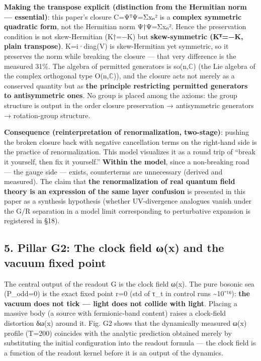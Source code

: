 \documentclass[
]{article}
\begin{document}
\textbf{Making the transpose explicit (distinction from the Hermitian
norm --- essential)}: this paper's closure C=ΨᵀΨ=Σxₙ² is a
\textbf{complex symmetric quadratic form}, not the Hermitian norm
Ψ†Ψ=Σ\textbar xₙ\textbar². Hence the preservation condition is not
skew-Hermitian (K†=−K) but \textbf{skew-symmetric (Kᵀ=−K, plain
transpose)}. K=i·diag(V) is skew-Hermitian yet symmetric, so it
preserves the norm while breaking the closure --- that very difference
is the measured 31\%. The algebra of permitted generators is
so(n,\(\mathbb{C}\)) (the Lie algebra of the complex orthogonal type
O(n,\(\mathbb{C}\))), and the closure acts not merely as a conserved
quantity but as \textbf{the principle restricting permitted generators
to antisymmetric ones}. No group is placed among the axioms: the group
structure is output in the order closure preservation → antisymmetric
generators → rotation-group structure.

\textbf{Consequence (reinterpretation of renormalization, two-stage)}:
pushing the broken closure back with negative cancellation terms on the
right-hand side is the practice of renormalization. This model
visualizes it as a round trip of ``break it yourself, then fix it
yourself.'' \textbf{Within the model}, since a non-breaking road --- the
gauge side --- exists, counterterms are unnecessary (derived and
measured). The claim that \textbf{the renormalization of real quantum
field theory is an expression of the same layer confusion} is presented
in this paper as a synthesis hypothesis (whether UV-divergence analogues
vanish under the G/R separation in a model limit corresponding to
perturbative expansion is registered in §18).

\subsection{5. Pillar G2: The clock field ω(x) and the vacuum fixed
point}\label{pillar-g2-the-clock-field-ux3c9x-and-the-vacuum-fixed-point}

The central output of the readout G is the clock field ω(x). The pure
bosonic sea (P\_odd=0) is the exact fixed point r=0 (std of τ\_t in
control runs \textasciitilde10⁻¹⁶): \textbf{the vacuum does not tick ---
light does not collide with light}. Placing a massive body (a source
with fermionic-band content) raises a clock-field distortion δω(x)
around it. Fig. G2 shows that the dynamically measured ω(x) profile
(T=200) coincides with the analytic prediction obtained merely by
substituting the initial configuration into the readout formula --- the
clock field is a function of the readout kernel before it is an output
of the dynamics.
\end{document}
